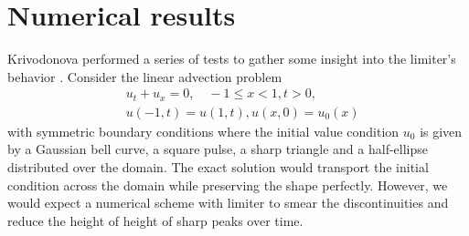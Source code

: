 \section{Numerical results}
\label{sec:results}

Krivodonova performed a series of tests to gather some insight into the limiter's behavior \cite[section 4]{Krivodonova}.
Consider the linear advection problem
\begin{align*}
  & u_{t} + u_{x} = 0, \quad -1 \le x < 1, t > 0,\\
  & u(-1, t) = u(1, t), u(x, 0) = u_{0}(x)
\end{align*}
with symmetric boundary conditions where the initial value condition $u_{0}$ is given by a Gaussian bell curve, a square pulse, a sharp triangle and a half-ellipse distributed over the domain.
The exact solution would transport the initial condition across the domain while preserving the shape perfectly.
However, we would expect a numerical scheme with limiter to smear the discontinuities and reduce the height of height of sharp peaks over time.

